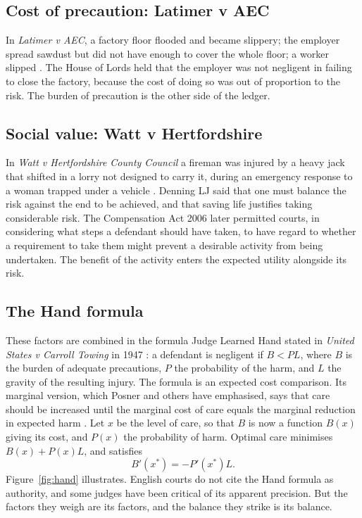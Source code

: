 \subsection{Cost of precaution: Latimer v AEC}

In \emph{Latimer v AEC}, a factory floor flooded and became slippery; the employer spread sawdust but did not have enough to cover the whole floor; a worker slipped \citep{latimer1953}. The House of Lords held that the employer was not negligent in failing to close the factory, because the cost of doing so was out of proportion to the risk. The burden of precaution is the other side of the ledger.

\subsection{Social value: Watt v Hertfordshire}

In \emph{Watt v Hertfordshire County Council} a fireman was injured by a heavy jack that shifted in a lorry not designed to carry it, during an emergency response to a woman trapped under a vehicle \citep{watt1954}. Denning LJ said that one must balance the risk against the end to be achieved, and that saving life justifies taking considerable risk. The Compensation Act 2006 later permitted courts, in considering what steps a defendant should have taken, to have regard to whether a requirement to take them might prevent a desirable activity from being undertaken. The benefit of the activity enters the expected utility alongside its risk.

\subsection{The Hand formula}

These factors are combined in the formula Judge Learned Hand stated in \emph{United States v Carroll Towing} in 1947 \citep{carroll1947}: a defendant is negligent if $B < PL$, where $B$ is the burden of adequate precautions, $P$ the probability of the harm, and $L$ the gravity of the resulting injury. The formula is an expected cost comparison. Its marginal version, which Posner and others have emphasised, says that care should be increased until the marginal cost of care equals the marginal reduction in expected harm \citep{posner2014}. Let $x$ be the level of care, so that $B$ is now a function $B(x)$ giving its cost, and $P(x)$ the probability of harm. Optimal care minimises $B(x) + P(x)L$, and satisfies
\begin{equation}
B'(x^\ast) = -P'(x^\ast) L .
\label{eq:hand}
\end{equation}
Figure~\ref{fig:hand} illustrates. English courts do not cite the Hand formula as authority, and some judges have been critical of its apparent precision. But the factors they weigh are its factors, and the balance they strike is its balance.

